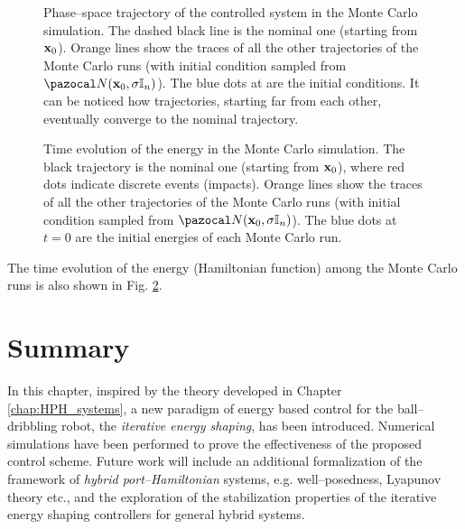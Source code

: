 %
\begin{figure}[h]
    \centering
    \caption[Phase--space trajectory of the controlled system in the Monte Carlo simulation]{Phase--space trajectory of the controlled system in the Monte Carlo simulation. The dashed black line is the nominal one (starting from $\mathbf{x}_0$). Orange lines show the traces of all the other trajectories of the Monte Carlo runs (with initial condition sampled from $\N(\xb_0,\sigma\mathbb{I}_n)$). The blue dots at are the initial conditions. It can be noticed how trajectories, starting far from each other, eventually converge to the nominal trajectory.}
    \label{fig:reg2}
\end{figure}
%
\begin{figure}[!h]
    \centering
    \caption[Time evolution of the energy in the Monte Carlo simulation]{Time evolution of the energy in the Monte Carlo simulation. The black trajectory is the nominal one (starting from $\mathbf{x}_0$), where red dots indicate discrete events (impacts). Orange lines show the traces of all the other trajectories of the Monte Carlo runs (with initial condition sampled from $\N(\xb_0,\sigma\mathbb{I}_n)$). The blue dots at $t=0$ are the initial energies of each Monte Carlo run.}
    \label{fig:reg3}
\end{figure}

The time evolution of the energy (Hamiltonian function) among the Monte Carlo runs is also shown in Fig. \ref{fig:reg3}.
%
\clearpage
\section{Summary}\label{sec:concl}
%
In this chapter, inspired by the theory developed in Chapter \ref{chap:HPH_systems}, a new paradigm of energy based control for the ball--dribbling robot, the \textit{iterative energy shaping}, has been introduced. Numerical simulations have been performed to prove the effectiveness of the proposed control scheme. Future work will include an additional formalization of the framework of \textit{hybrid port--Hamiltonian} systems, e.g. well--posedness, Lyapunov theory etc., and the exploration of the stabilization properties of the {iterative energy shaping} controllers for general hybrid systems.